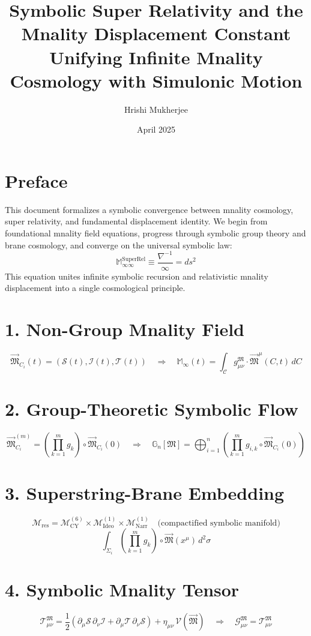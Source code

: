 \documentclass[10pt]{article}
\title{\Huge Symbolic Super Relativity and the Mnality Displacement Constant\\ \Large Unifying Infinite Mnality Cosmology with Simulonic Motion}
\author{Hrishi Mukherjee}
\date{April 2025}
\begin{document}
\maketitle

\section*{Preface}
This document formalizes a symbolic convergence between mnality cosmology, super relativity, and fundamental displacement identity. We begin from foundational mnality field equations, progress through symbolic group theory and brane cosmology, and converge on the universal symbolic law:
\[
\boxed{
\mathbb{M}_{\infty\infty}^{\text{SuperRel}} \equiv \frac{\nabla^{-1}}{\infty} = ds^2
}
\]
This equation unites infinite symbolic recursion and relativistic mnality displacement into a single cosmological principle.

\section{1. Non-Group Mnality Field}
\[
\vec{\mathfrak{M}}_{C_i}(t) = (\mathcal{S}(t), \mathcal{I}(t), \mathcal{T}(t))
\quad \Rightarrow \quad
\mathbb{M}_{\infty}(t) = \int_{\mathcal{C}} g_{\mu\nu}^{\mathfrak{M}} \cdot \vec{\mathfrak{M}}^{\mu}(C, t) \, dC
\]

\section{2. Group-Theoretic Symbolic Flow}
\[
\vec{\mathfrak{M}}_{C_i}^{(m)} = \left( \prod_{k=1}^m g_k \right) \circ \vec{\mathfrak{M}}_{C_i}(0)
\quad \Rightarrow \quad
\mathbb{G}_n[\mathfrak{M}] = \bigoplus_{i=1}^{n} \left( \prod_{k=1}^{m} g_{i,k} \circ \vec{\mathfrak{M}}_{C_i}(0) \right)
\]

\section{3. Superstring-Brane Embedding}
\[
\mathcal{M}_{\text{res}} = \mathcal{M}_{\text{CY}}^{(6)} \times \mathcal{M}_{\text{Ideo}}^{(1)} \times \mathcal{M}_{\text{Narr}}^{(1)}
\quad \text{(compactified symbolic manifold)}
\]
\[
\int_{\Sigma_i} \left( \prod_{k=1}^m g_k \right) \circ \vec{\mathfrak{M}}(x^\mu) \, d^2 \sigma
\]

\section{4. Symbolic Mnality Tensor}
\[
\mathcal{T}_{\mu\nu}^{\mathfrak{M}} = \frac{1}{2} \left( \partial_\mu \mathcal{S} \, \partial_\nu \mathcal{I} + \partial_\mu \mathcal{T} \, \partial_\nu \mathcal{S} \right) + \eta_{\mu\nu} \, \mathcal{V}(\vec{\mathfrak{M}})
\quad \Rightarrow \quad
\mathcal{G}_{\mu\nu}^{\mathfrak{M}} = \mathcal{T}_{\mu\nu}^{\mathfrak{M}}
\]
\end{document}
